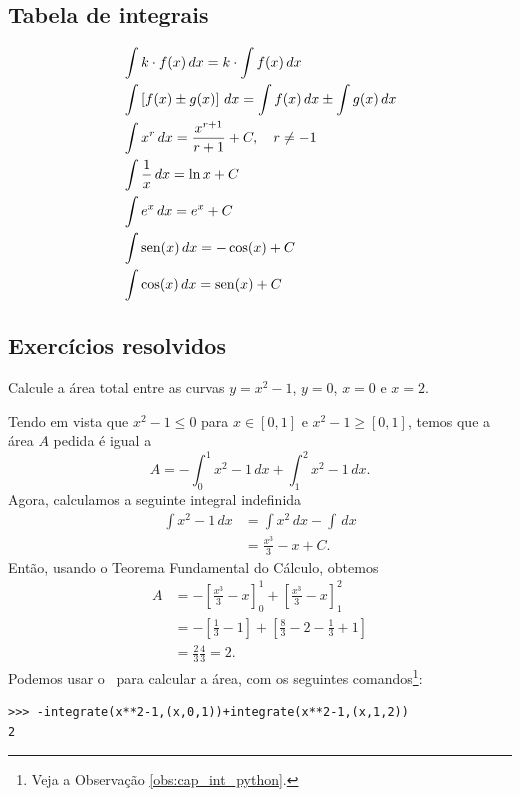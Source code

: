 \subsection{Tabela de integrais}

\begin{small}
\begin{align}
  & \int k\cdot f(x)\,dx = k\cdot\int f(x)\,dx\\
  & \int \left[f(x)\pm g(x)\right]\,dx = \int f(x)\,dx \pm \int g(x)\,dx\\
  & \int x^r\,dx = \frac{x^{r+1}}{r+1} + C,\quad r\neq -1\\
  & \int \frac{1}{x}\,dx = \ln x + C \\
  & \int e^x\,dx = e^x + C \\
  & \int \operatorname{sen}(x)\,dx = -\cos(x) + C \\
  & \int \cos(x)\,dx = \operatorname{sen}(x) + C
\end{align}
\end{small}

\subsection*{Exercícios resolvidos}

\begin{exeresol}
  Calcule a área total entre as curvas $y=x^2-1$, $y=0$, $x=0$ e $x=2$.
\end{exeresol}
\begin{resol}
  Tendo em vista que $x^2-1\leq 0$ para $x\in [0, 1]$ e $x^2-1\geq [0, 1]$, temos que a área $A$ pedida é igual a
  \begin{equation}
    A = -\int_0^1 x^2 -1\,dx + \int_1^2 x^2-1\,dx.
  \end{equation}
  Agora, calculamos a seguinte integral indefinida
  \begin{align}
    \int x^2 - 1\,dx &= \int x^2\,dx - \int\,dx \\
                     &= \frac{x^3}{3} - x + C.
  \end{align}
  Então, usando o Teorema Fundamental do Cálculo, obtemos
  \begin{align}
    A &= -\left[\frac{x^3}{3}-x\right]_0^1 + \left[\frac{x^3}{3}-x\right]_1^2\\
      &= - \left[\frac{1}{3}-1\right] + \left[\frac{8}{3} - 2 - \frac{1}{3} + 1\right] \\
      &= \frac{2}{3} \frac{4}{3} = 2.
  \end{align}
\ifispython
Podemos usar o \sympy~para calcular a área, com os seguintes comandos\footnote{Veja a Observação \ref{obs:cap_int_python}.}:
\begin{verbatim}
>>> -integrate(x**2-1,(x,0,1))+integrate(x**2-1,(x,1,2))
2
\end{verbatim}
\fi  
\end{resol}

